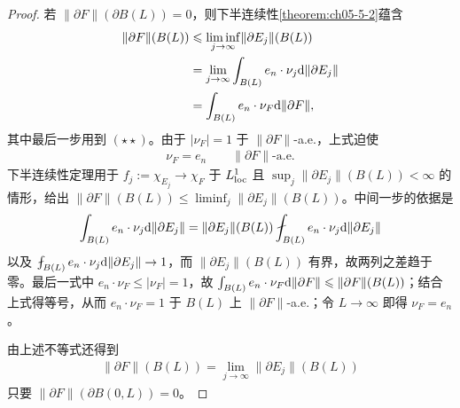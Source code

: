 \documentclass[../../main.tex]{subfiles}%
\begin{document}
\begin{proof}
若 $\lVert\partial F\rVert(\partial B(L))=0$，则下半连续性\cref{theorem:ch05-5-2}蕴含%
\begin{align*}
\lVert\partial F\rVert(B(L))
&\leqslant\liminf_{j\to\infty}\lVert\partial E_j\rVert(B(L))\\
&=\lim_{j\to\infty}\int_{B(L)}e_n\cdot\nu_j\mathrm{d}\lVert\partial E_j\rVert\\
&=\int_{B(L)}e_n\cdot\nu_F\mathrm{d}\lVert\partial F\rVert,
\end{align*}
其中最后一步用到 $(\star\star)$。由于 $\lvert\nu_F\rvert=1$ 于 $\lVert\partial F\rVert$-a.e.，上式迫使
\begin{align*}
\nu_F=e_n\qquad\lVert\partial F\rVert\text{-a.e.}
\end{align*}
下半连续性定理用于 $f_j:=\chi_{E_j}\to\chi_F$ 于 $L^1_{\mathrm{loc}}$ 且 $\sup_j\lVert\partial E_j\rVert(B(L))<\infty$ 的情形，给出 $\lVert\partial F\rVert(B(L))\leqslant\liminf_j\lVert\partial E_j\rVert(B(L))$。中间一步的依据是
\begin{align*}
\int_{B(L)}e_n\cdot\nu_j\diff\lVert\partial E_j\rVert=\lVert\partial E_j\rVert(B(L))\fint_{B(L)}e_n\cdot\nu_j\diff\lVert\partial E_j\rVert
\end{align*}
以及 $\fint_{B(L)}e_n\cdot\nu_j\diff\lVert\partial E_j\rVert\to1$，而 $\lVert\partial E_j\rVert(B(L))$ 有界，故两列之差趋于零。最后一式中 $e_n\cdot\nu_F\leqslant\lvert\nu_F\rvert=1$，故 $\int_{B(L)}e_n\cdot\nu_F\mathrm{d}\lVert\partial F\rVert\leqslant\lVert\partial F\rVert(B(L))$；结合上式得等号，从而 $e_n\cdot\nu_F=1$ 于 $B(L)$ 上 $\lVert\partial F\rVert$-a.e.；令 $L\to\infty$ 即得 $\nu_F=e_n$。

由上述不等式还得到
\begin{align*}
\lVert\partial F\rVert(B(L))=\lim_{j\to\infty}\lVert\partial E_j\rVert(B(L))
\end{align*}
只要 $\lVert\partial F\rVert(\partial B(0,L))=0$。


\end{proof}
\end{document}
